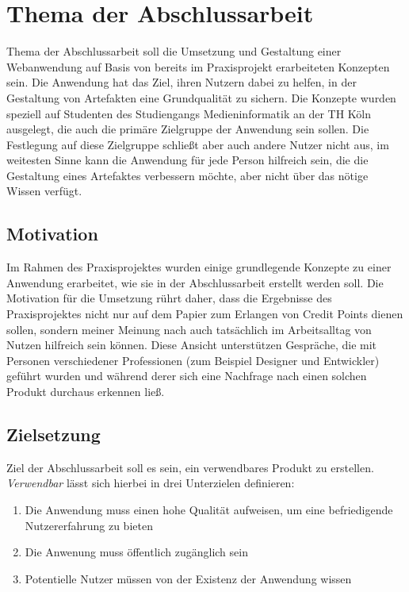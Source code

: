 \section{Thema der Abschlussarbeit}
Thema der Abschlussarbeit soll die Umsetzung und Gestaltung einer Webanwendung auf Basis von bereits im Praxisprojekt erarbeiteten Konzepten sein.
Die Anwendung hat das Ziel, ihren Nutzern dabei zu helfen, in der Gestaltung von Artefakten eine Grundqualität zu sichern. Die Konzepte wurden speziell auf Studenten des Studiengangs Medieninformatik an der TH Köln ausgelegt, die auch die primäre Zielgruppe der Anwendung sein sollen. Die Festlegung auf diese Zielgruppe schließt aber auch andere Nutzer nicht aus, im weitesten Sinne kann die Anwendung für jede Person hilfreich sein, die die Gestaltung eines Artefaktes verbessern möchte, aber nicht über das nötige Wissen verfügt.\\

\subsection{Motivation}
Im Rahmen des Praxisprojektes wurden einige grundlegende Konzepte zu einer Anwendung erarbeitet, wie sie in der Abschlussarbeit erstellt werden soll. Die Motivation für die Umsetzung rührt daher, dass die Ergebnisse des Praxisprojektes nicht nur auf dem Papier zum Erlangen von Credit Points dienen sollen, sondern meiner Meinung nach auch tatsächlich im Arbeitsalltag von Nutzen hilfreich sein können. Diese Ansicht unterstützen Gespräche, die mit Personen verschiedener Professionen (zum Beispiel Designer und Entwickler) geführt wurden und während derer sich eine Nachfrage nach einen solchen Produkt durchaus erkennen ließ.

\subsection{Zielsetzung}
Ziel der Abschlussarbeit soll es sein, ein verwendbares Produkt zu erstellen. \textit{Verwendbar} lässt sich hierbei in drei Unterzielen definieren:

\begin{enumerate}
  \item Die Anwendung muss einen hohe Qualität aufweisen, um eine befriedigende Nutzererfahrung zu bieten
  \item Die Anwenung muss öffentlich zugänglich sein
  \item Potentielle Nutzer müssen von der Existenz der Anwendung wissen
\end{enumerate}


